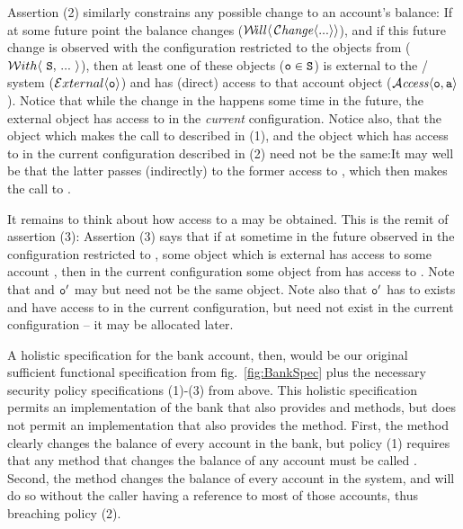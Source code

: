 Assertion (2) similarly constrains any possible change to an 
account's balance: 
If at some future point the balance changes  (${\Future{\,\Changes{...}}}$),  %
and if this future change is observed with the configuration restricted to the objects from \SF 
  (\ie $\Using{...}{\prg{S}}$), then 
at least one of these objects ($\prg{o}\in\SF$) is external to the / system ($\External{\prg{o}}$) and 
has (direct) access to that account object
($\CanAccess{\prg{o}}{\prg{a}}$).
Notice that while the change in the  happens some time in the future,
the external object  has access to  in the \emph{current} configuration.
Notice also, that the object which makes the call to  described in (1), and the object which 
has access to  in the current configuration described in (2) need not be the same:It may well be that the
latter passes (indirectly) to the former access to , which then   makes the call
to .

It remains to think about how access to a  may be obtained. This is the remit of assertion (3): 
Assertion (3) says that if at sometime in the future observed in the configuration restricted to \SF, 
some object  which is external has access to some account , then in the current configuration some object 
from \SF has access to . Note that  and $\prg{o}'$ may but need not be the same object. Note also
that $\prg{o}'$ has to exists and have access to  in the current configuration, but 
 need not exist in the current configuration -- it may be allocated later.

\vspace{.1cm}

A  holistic  specification for the bank account, then,
would be our original sufficient functional specification from
fig.~\ref{fig:BankSpec} plus the necessary security policy
specifications (1)-(3) from above. %
This holistic specification
permits an implementation of the bank that also provides  
and  methods,  but does not permit an
implementation that also provides the  method.
First, the  method clearly changes the balance of
every account in the bank, but policy (1) requires that any method
that changes the balance of any account must be called .
Second, the  method changes the balance of every account in
the system, and will do so without the caller having a reference to
most of those accounts, thus breaching policy (2).   
 
